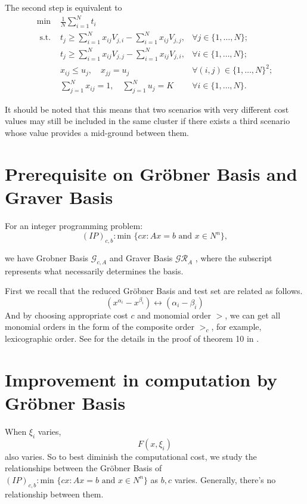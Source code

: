 \documentclass{article}
\theoremstyle{plain}
\theoremstyle{definition}
\begin{document}
The second step is equivalent to 
\begin{equation}
\begin{array}{llr}
\min & \frac{1}{N} \sum_{i=1}^{N} t_{i} & \\
\text { s.t. } & t_{j} \geq \sum_{i=1}^{N} x_{i j} V_{j, i}-\sum_{i=1}^{N} x_{i j} V_{j, j}, & \forall j \in\{1, \ldots, N\} ; \\
& t_{j} \geq \sum_{i=1}^{N} x_{i j} V_{j, j}-\sum_{i=1}^{N} x_{i j} V_{j, i}, & \forall i \in\{1, \ldots, N\} ; \\
& x_{i j} \leq u_{j}, \quad x_{j j}=u_{j} & \forall(i, j) \in\{1, \ldots, N\}^{2} ; \\
& \sum_{j=1}^{N} x_{i j}=1, \quad \sum_{j=1}^{N} u_{j}=K & \forall i \in\{1, \ldots, N\}.\
\end{array}
\end{equation}

It should be noted that this means that two scenarios with very different cost values may still be included in the same cluster if there exists a third scenario whose value provides a mid-ground between them.

\section{Prerequisite on Gröbner Basis and Graver Basis}

For an integer programming problem:
$$(IP)_{c,b}: \text{min } \{cx: Ax=b \text{ and } x\in N^{n}\},
$$

we have Grobner Basis $\mathcal{G}_{c,A}$ and Graver Basis $\mathcal{GR}_{A}$ , where the subscript represents what necessarily determines the basis.

First we recall that the reduced Gröbner Basis and test set are related as follows.
$$ (x^{\alpha_i}-x^{\beta_i}) \leftrightarrow (\alpha_i-\beta_i)
$$
 And by choosing appropriate cost $c$ and monomial order $>$, we can get all monomial orders in the form of the composite order $>_c$, for example, lexicographic order.  See for the details in the proof of theorem 10 in \cite{ref2}.

\section{Improvement in computation by Gröbner Basis}

When $\xi_i$ varies, 
$$
 F\left(x, \xi_{i}\right)
$$
also varies. So to best diminish the computational cost, we study the relationships between the Gröbner Basis of   $(IP)_{c,b}: \text{min } \{c x: Ax=b \text{ and } x\in N^{n}\}$ as $b,c$ varies. Generally, there's no relationship between them. \\
\end{document}
